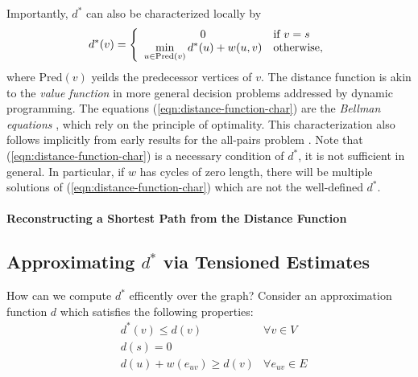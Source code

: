 Importantly, $d^*$ can also be characterized locally by
\begin{equation}
   d^*(v) = 
   \left\{ \begin{array}{cl}
      0 & \mbox{if } v = s \\
      \displaystyle\min_{u \in \mbox{\scriptsize Pred}(v)} d^*(u) + w(u,v) & \mbox{otherwise,} \\
   \end{array} \right.
   \label{eqn:distance-function-char}
\end{equation}
where $\mbox{Pred}(v)$ yeilds the predecessor vertices
of $v$.
The distance function is akin to the \emph{value function}
in more general decision problems addressed by dynamic programming.
The equations (\ref{eqn:distance-function-char})
are the \emph{Bellman equations} \citep{bellman1958routing},
which rely on the principle of optimality.
This characterization also follows implicitly from early results for
the all-pairs problem
\citep{shimbel1955communicationnets, beckmann1955transportation}.
Note that (\ref{eqn:distance-function-char}) is a necessary condition
of $d^*$,
it is not sufficient in general.
In particular,
if $w$ has cycles of zero length,
there will be multiple solutions of (\ref{eqn:distance-function-char})
which are not the well-defined $d^*$.

\paragraph{Reconstructing a Shortest Path from the Distance Function}

\subsection{Approximating $d^*$ via Tensioned Estimates}
\label{subsec:ibid-tension}

How can we compute $d^*$ efficently over the graph?
Consider an approximation function $d$
which satisfies the following properties:
\begin{subequations}%
   \begin{eqnarray}
      & d^*(v) \leq d(v) & \forall v \in V
         \label{eqn:ibid-relaxation-props-nounder} \\
      & d(s) = 0 &
         \label{eqn:ibid-relaxation-props-ds0} \\
      & d(u) + w(e_{uv}) \geq d(v) & \forall e_{uv} \in E
         \label{eqn:ibid-relaxation-props-tens}
   \end{eqnarray}%
   \label{eqn:ibid-relaxation-props}%
\end{subequations}%

